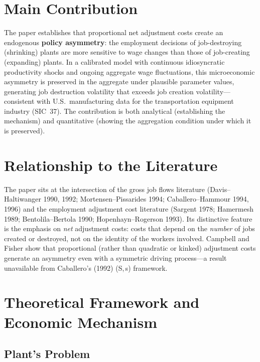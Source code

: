 \section{Main Contribution}

The paper establishes that proportional net adjustment costs create an
endogenous \textbf{policy asymmetry}: the employment decisions of job-destroying
(shrinking) plants are more sensitive to wage changes than those of
job-creating (expanding) plants. In a calibrated model with continuous
idiosyncratic productivity shocks and ongoing aggregate wage fluctuations,
this microeconomic asymmetry is preserved in the aggregate under plausible
parameter values, generating job destruction volatility that exceeds job
creation volatility---consistent with U.S.\ manufacturing data for the
transportation equipment industry (SIC~37). The contribution is both
analytical (establishing the mechanism) and quantitative (showing the
aggregation condition under which it is preserved).

\section{Relationship to the Literature}

The paper sits at the intersection of the gross job flows literature
(Davis--Haltiwanger 1990, 1992; Mortensen--Pissarides 1994;
Caballero--Hammour 1994, 1996) and the employment adjustment cost literature
(Sargent 1978; Hamermesh 1989; Bentolila--Bertola 1990; Hopenhayn--Rogerson
1993). Its distinctive feature is the emphasis on \emph{net} adjustment costs:
costs that depend on the \emph{number} of jobs created or destroyed, not on
the identity of the workers involved. Campbell and Fisher show that
proportional (rather than quadratic or kinked) adjustment costs generate an
asymmetry even with a symmetric driving process---a result unavailable from
Caballero's (1992) (S,\,s) framework.

\section{Theoretical Framework and Economic Mechanism}

\subsection*{Plant's Problem}


